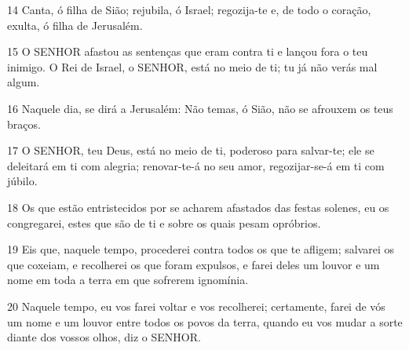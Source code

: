 \par 14 Canta, ó filha de Sião; rejubila, ó Israel; regozija-te e, de todo o coração, exulta, ó filha de Jerusalém.
\par 15 O SENHOR afastou as sentenças que eram contra ti e lançou fora o teu inimigo. O Rei de Israel, o SENHOR, está no meio de ti; tu já não verás mal algum.
\par 16 Naquele dia, se dirá a Jerusalém: Não temas, ó Sião, não se afrouxem os teus braços.
\par 17 O SENHOR, teu Deus, está no meio de ti, poderoso para salvar-te; ele se deleitará em ti com alegria; renovar-te-á no seu amor, regozijar-se-á em ti com júbilo.
\par 18 Os que estão entristecidos por se acharem afastados das festas solenes, eu os congregarei, estes que são de ti e sobre os quais pesam opróbrios.
\par 19 Eis que, naquele tempo, procederei contra todos os que te afligem; salvarei os que coxeiam, e recolherei os que foram expulsos, e farei deles um louvor e um nome em toda a terra em que sofrerem ignomínia.
\par 20 Naquele tempo, eu vos farei voltar e vos recolherei; certamente, farei de vós um nome e um louvor entre todos os povos da terra, quando eu vos mudar a sorte diante dos vossos olhos, diz o SENHOR.


